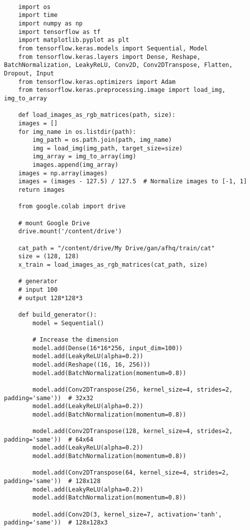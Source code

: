 \begin{lstlisting}[style=mypython, caption=Apply new dataset]

    import os
    import time
    import numpy as np
    import tensorflow as tf
    import matplotlib.pyplot as plt
    from tensorflow.keras.models import Sequential, Model
    from tensorflow.keras.layers import Dense, Reshape, BatchNormalization, LeakyReLU, Conv2D, Conv2DTranspose, Flatten, Dropout, Input
    from tensorflow.keras.optimizers import Adam
    from tensorflow.keras.preprocessing.image import load_img, img_to_array

    def load_images_as_rgb_matrices(path, size):
    images = []
    for img_name in os.listdir(path):
        img_path = os.path.join(path, img_name)
        img = load_img(img_path, target_size=size)
        img_array = img_to_array(img)
        images.append(img_array)
    images = np.array(images)
    images = (images - 127.5) / 127.5  # Normalize images to [-1, 1]
    return images

    from google.colab import drive

    # mount Google Drive
    drive.mount('/content/drive')

    cat_path = "/content/drive/My Drive/gan/afhq/train/cat"
    size = (128, 128)
    x_train = load_images_as_rgb_matrices(cat_path, size)

    # generator
    # input 100
    # output 128*128*3

    def build_generator():
        model = Sequential()

        # Increase the dimension
        model.add(Dense(16*16*256, input_dim=100))
        model.add(LeakyReLU(alpha=0.2))
        model.add(Reshape((16, 16, 256)))
        model.add(BatchNormalization(momentum=0.8))

        model.add(Conv2DTranspose(256, kernel_size=4, strides=2, padding='same'))  # 32x32
        model.add(LeakyReLU(alpha=0.2))
        model.add(BatchNormalization(momentum=0.8))

        model.add(Conv2DTranspose(128, kernel_size=4, strides=2, padding='same'))  # 64x64
        model.add(LeakyReLU(alpha=0.2))
        model.add(BatchNormalization(momentum=0.8))

        model.add(Conv2DTranspose(64, kernel_size=4, strides=2, padding='same'))  # 128x128
        model.add(LeakyReLU(alpha=0.2))
        model.add(BatchNormalization(momentum=0.8))

        model.add(Conv2D(3, kernel_size=7, activation='tanh', padding='same'))  # 128x128x3


\end{lstlisting}
